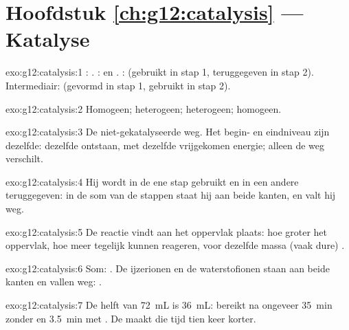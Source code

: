 \section*{Hoofdstuk \ref{ch:g12:catalysis} --- Katalyse}

\begin{solution}{exo:g12:catalysis:1}
: . :  en . :
 (gebruikt in stap 1, teruggegeven in stap 2). Intermediair:
 (gevormd in stap 1, gebruikt in stap 2).
\end{solution}

\begin{solution}{exo:g12:catalysis:2}
Homogeen; heterogeen; heterogeen; homogeen.
\end{solution}

\begin{solution}{exo:g12:catalysis:3}
De niet-gekatalyseerde weg. Het begin- en eindniveau zijn dezelfde:
dezelfde  ontstaan, met dezelfde vrijgekomen energie;
alleen de weg verschilt.
\end{solution}

\begin{solution}{exo:g12:catalysis:4}
Hij wordt in de ene stap gebruikt en in een andere teruggegeven: in de som
van de stappen staat hij aan beide kanten, en valt hij weg.
\end{solution}

\begin{solution}{exo:g12:catalysis:5}
De reactie vindt aan het oppervlak plaats: hoe groter het oppervlak, hoe
meer  tegelijk kunnen reageren, voor dezelfde massa (vaak dure)
.
\end{solution}

\begin{solution}{exo:g12:catalysis:6}
Som: . De ijzerionen en de waterstofionen staan aan beide
kanten en vallen weg: .
\end{solution}

\begin{solution}{exo:g12:catalysis:7}
De helft van \qty{72}{mL} is \qty{36}{mL}: bereikt na ongeveer
\qty{35}{min} zonder  en \qty{3.5}{min} met . De
 maakt die tijd tien keer korter.
\end{solution}

